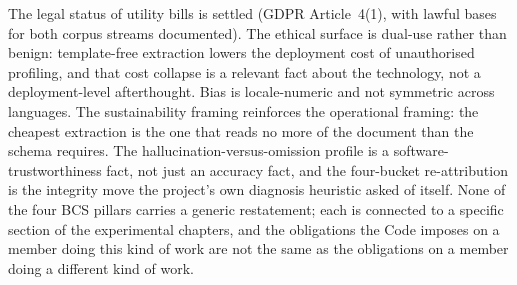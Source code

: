 The legal status of utility bills is settled (GDPR Article~4(1), with lawful
bases for both corpus streams documented). The ethical surface is dual-use
rather than benign: template-free extraction lowers the deployment cost of
unauthorised profiling, and that cost collapse is a relevant fact about the
technology, not a deployment-level afterthought. Bias is locale-numeric and
not symmetric across languages. The sustainability framing reinforces the
operational framing: the cheapest extraction is the one that reads no more of
the document than the schema requires. The hallucination-versus-omission
profile is a software-trustworthiness fact, not just an accuracy fact, and the
four-bucket re-attribution is the integrity move the project's own diagnosis
heuristic asked of itself. None of the four BCS pillars carries a generic
restatement; each is connected to a specific section of the experimental
chapters, and the obligations the Code imposes on a member doing this kind of
work are not the same as the obligations on a member doing a different kind of
work.

